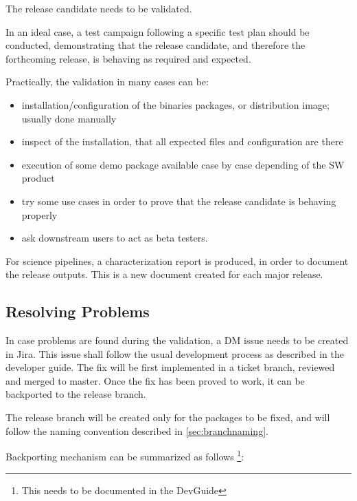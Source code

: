 The release candidate needs to be validated.

In an ideal case, a test campaign following a specific test plan should be conducted, demonstrating that the release candidate, and therefore the forthcoming release, is behaving as required and expected.

Practically, the validation in many cases can be:

\begin{itemize}
\item installation/configuration of the binaries packages, or distribution image; usually done manually
\item inspect of the installation, that all expected files and configuration are there
\item execution of some demo package available case by case depending of the SW product
\item try some use cases in order to prove that the release candidate is behaving properly
\item ask downstream users to act as beta testers.
\end{itemize}

For science pipelines, a characterization report is produced, in order to document the release outputs.
This is a new document created for each major release.


\subsection{Resolving Problems}

In case problems are found during the validation, a DM issue needs to be created in Jira.
This issue shall follow the usual development process as described in the developer guide.
The fix will be first implemented in a ticket branch, reviewed and merged to master.
Once the fix has been proved to work, it can be backported to the release branch.

The release branch will be created only for the packages to be fixed, and will follow the naming convention described in \ref{sec:branchnaming}.

Backporting mechanism can be summarized as follows \footnote{This needs to be documented in the DevGuide}:


